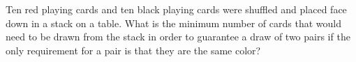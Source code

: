 Ten red playing cards and ten black playing cards were shuffled and placed face down in a stack on a table. What is the minimum number of cards that would need to be drawn from the stack in order to guarantee a draw of two pairs if the only requirement for a pair is that they are the same color?
